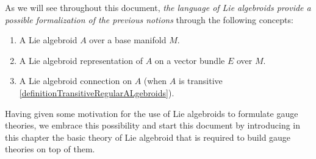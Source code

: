 As we will see throughout this document, \textit{the language of Lie algebroids provide a possible formalization of the previous notions} through the following concepts:
\begin{enumerate}
    \item A Lie algebroid $A$ over a base manifold $M$.
    
    \item A Lie algebroid representation of $A$ on a vector bundle $E$ over $M$.
    
    \item A Lie algebroid connection on $A$ (when $A$ is transitive \ref{definitionTransitiveRegularALgebroids}).
\end{enumerate}

Having given some motivation for the use of Lie algebroids to formulate gauge theories, we embrace this possibility and start this document by introducing in this chapter the basic theory of Lie algebroid that is required to build gauge theories on top of them.


    
        
